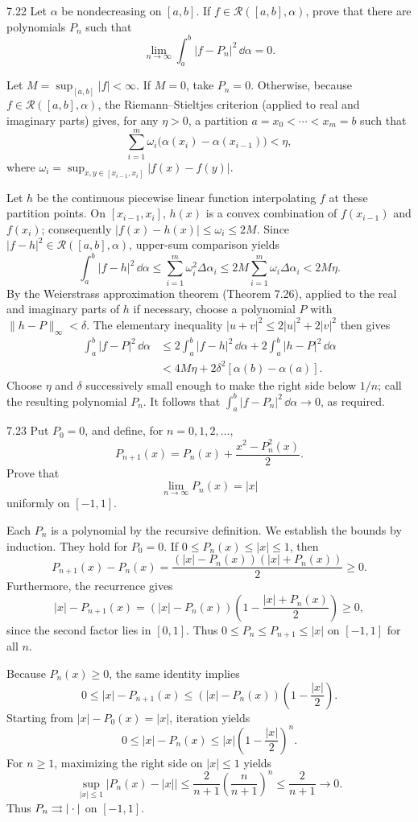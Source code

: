\documentclass[11pt, oneside]{article}
\begin{document}
\begin{exercise}{7.22}
Let $\alpha$ be nondecreasing on $[a, b]$. If $f\in\mathcal{R}([a, b], \alpha)$, prove that there are polynomials $P_n$ such that
\[
 \lim_{n\to\infty}\int_a^b|f-P_n|^2\,\dd\alpha=0.
\]
\end{exercise}
\begin{solution}
Let $M=\sup_{[a, b]}|f|<\infty$. If $M=0$, take $P_n=0$. Otherwise, because $f\in\mathcal{R}([a, b], \alpha)$, the Riemann--Stieltjes criterion (applied to real and imaginary parts) gives, for any $\eta>0$, a partition $a=x_0<\cdots<x_m=b$ such that
\[
 \sum_{i=1}^{m}\omega_i\bigl(\alpha(x_i)-\alpha(x_{i-1})\bigr)<\eta,
\]
where $\omega_i=\sup_{x, y\in[x_{i-1}, x_i]}|f(x)-f(y)|$.

Let $h$ be the continuous piecewise linear function interpolating $f$ at these partition points. On $[x_{i-1}, x_i]$, $h(x)$ is a convex combination of $f(x_{i-1})$ and $f(x_i)$; consequently $|f(x)-h(x)|\le\omega_i\le2M$. Since $|f-h|^2\in\mathcal{R}([a, b], \alpha)$, upper-sum comparison yields
\[
 \int_a^b|f-h|^2\,\dd\alpha
 \le\sum_{i=1}^{m}\omega_i^2\Delta\alpha_i
 \le2M\sum_{i=1}^{m}\omega_i\Delta\alpha_i<2M\eta.
\]
By the Weierstrass approximation theorem (Theorem 7.26), applied to the real and imaginary parts of $h$ if necessary, choose a polynomial $P$ with $\|h-P\|_\infty<\delta$. The elementary inequality $|u+v|^2\le2|u|^2+2|v|^2$ then gives
\[
 \begin{aligned}
 \int_a^b|f-P|^2\,\dd\alpha
 &\le2\int_a^b|f-h|^2\,\dd\alpha
   +2\int_a^b|h-P|^2\,\dd\alpha\\
 &<4M\eta+2\delta^2[\alpha(b)-\alpha(a)].
 \end{aligned}
\]
Choose $\eta$ and $\delta$ successively small enough to make the right side below $1/n$; call the resulting polynomial $P_n$. It follows that $\int_a^b|f-P_n|^2\,\dd\alpha\to0$, as required.
\end{solution}

\begin{exercise}{7.23}
Put $P_0=0$, and define, for $n=0, 1, 2, \ldots$,
\[
 P_{n+1}(x)=P_n(x)+\frac{x^2-P_n^2(x)}2.
\]
Prove that
\[
 \lim_{n\to\infty}P_n(x)=|x|
\]
uniformly on $[-1, 1]$.
\end{exercise}
\begin{solution}
Each $P_n$ is a polynomial by the recursive definition. We establish the bounds by induction. They hold for $P_0=0$. If $0\le P_n(x)\le|x|\le1$, then
\[
 P_{n+1}(x)-P_n(x)=\frac{(|x|-P_n(x))(|x|+P_n(x))}2\ge0.
\]
Furthermore, the recurrence gives
\[
 |x|-P_{n+1}(x)
 =(|x|-P_n(x))\left(1-\frac{|x|+P_n(x)}2\right)\ge0,
\]
since the second factor lies in $[0, 1]$. Thus $0\le P_n\le P_{n+1}\le|x|$ on $[-1, 1]$ for all $n$.

Because $P_n(x)\ge0$, the same identity implies
\[
 0\le |x|-P_{n+1}(x)
 \le (|x|-P_n(x))\left(1-\frac{|x|}2\right).
\]
Starting from $|x|-P_0(x)=|x|$, iteration yields
\[
 0\le|x|-P_n(x)\le |x|\left(1-\frac{|x|}2\right)^n.
\]
For $n\ge1$, maximizing the right side on $|x|\le1$ yields
\[
 \sup_{|x|\le1}|P_n(x)-|x||
 \le\frac2{n+1}\left(\frac n{n+1}\right)^n
 \le\frac2{n+1}\longrightarrow0.
\]
Thus $P_n\rightrightarrows |\cdot|$ on $[-1, 1]$.
\end{solution}
\end{document}
